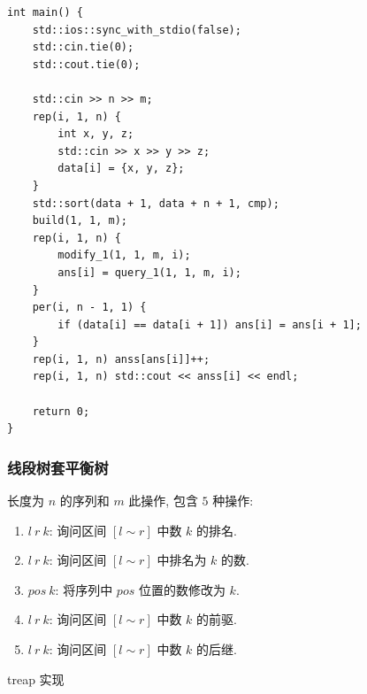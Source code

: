 \documentclass[UTF8, a4paper, titlepage, twoside]{ctexart}
\begin{document}
\begin{lstlisting}[style=cpp]
int main() {
    std::ios::sync_with_stdio(false);
    std::cin.tie(0);
    std::cout.tie(0);

    std::cin >> n >> m;
    rep(i, 1, n) {
        int x, y, z;
        std::cin >> x >> y >> z;
        data[i] = {x, y, z};
    }
    std::sort(data + 1, data + n + 1, cmp);
    build(1, 1, m);
    rep(i, 1, n) {
        modify_1(1, 1, m, i);
        ans[i] = query_1(1, 1, m, i);
    }
    per(i, n - 1, 1) {
        if (data[i] == data[i + 1]) ans[i] = ans[i + 1];
    }
    rep(i, 1, n) anss[ans[i]]++;
    rep(i, 1, n) std::cout << anss[i] << endl;

    return 0;
}
\end{lstlisting}

\subsubsection*{ 线段树套平衡树 }

长度为 $n$ 的序列和 $m$ 此操作, 包含 $5$ 种操作:
\begin{enumerate}
	\item $l \ r \ k$: 询问区间 $[l \sim r]$ 中数 $k$ 的排名.
	\item $l \ r \ k$: 询问区间 $[l \sim r]$ 中排名为 $k$ 的数.
	\item $pos \ k$: 将序列中 $pos$ 位置的数修改为 $k$.
	\item $l \ r \ k$: 询问区间 $[l \sim r]$ 中数 $k$ 的前驱.
	\item $l \ r \ k$: 询问区间 $[l \sim r]$ 中数 $k$ 的后继.
\end{enumerate}

treap 实现
\end{document}
